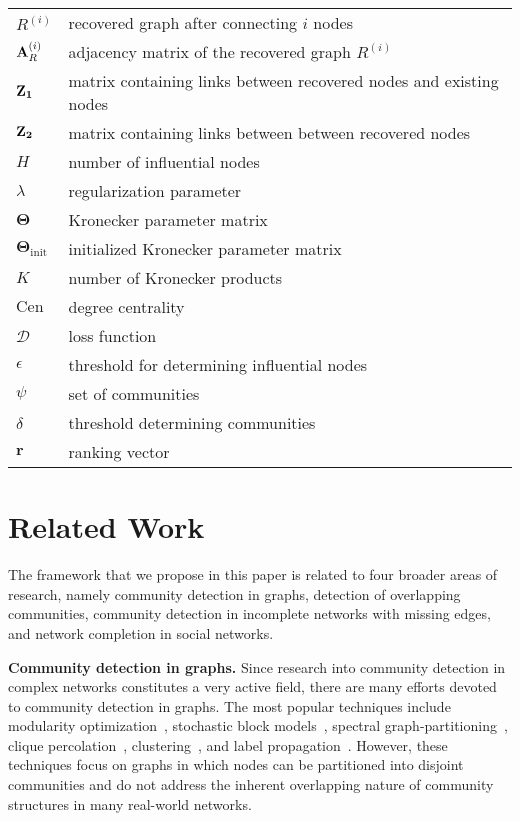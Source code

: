 \documentclass[format=acmsmall, review=false, screen=true]{acmart}
\begin{document}
\begin{table}[]
\begin{tabular}{l|l}
$R^{(i)}$              & recovered graph after connecting $i$ nodes    \\
${\bf A}_R^{(i)}$      & adjacency matrix of the recovered graph $R^{(i)}$       \\
${\bf Z_1}$            & matrix containing links between recovered nodes and existing nodes            \\
${\bf Z_2}$            & matrix containing links between between recovered nodes            \\
$H$                    & number of influential nodes                 \\
$\lambda$  & regularization parameter				\\
$\bm{\Theta}$          & Kronecker parameter matrix                  \\
$\bm{\Theta}_{\text{init}}$          & initialized Kronecker parameter matrix                  \\
$K$                      & number of Kronecker products                   \\
$\text{Cen}$         & degree centrality                    \\
$\mathcal{D}$          & loss function                               \\
$\epsilon$             & threshold for determining influential nodes        \\
$\psi$                 & set of communities                          \\
$\delta$               & threshold determining communities              \\
${\bm r}$              & ranking vector                              \\
\hline
\end{tabular}
\end{table}
\section{Related Work}\label{sec:2}
The framework that we propose in this paper is related to four broader areas of research, namely community detection in graphs, detection of overlapping communities, community detection in incomplete networks with missing edges, and network completion in social networks.

{\bf Community detection in graphs.} Since research into community detection in complex networks constitutes a very active field, there are many efforts devoted to community detection in graphs. The most popular techniques include modularity optimization~\cite{newman2006modularity}, stochastic block models~\cite{sbm}, spectral graph-partitioning~\cite{newman2013spectral}, clique percolation~\cite{du2007community}, clustering~\cite{chen2012dense}, and label propagation~\cite{raghavan2007near,tkdd1}. However, these techniques focus on graphs in which nodes can be partitioned into disjoint communities and do not address the inherent overlapping nature of community structures in many real-world networks. 
\end{document}
